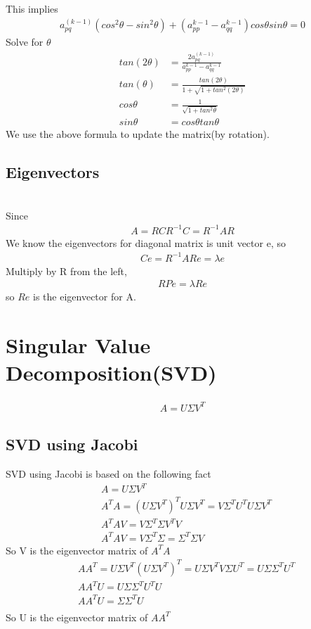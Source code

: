 \documentclass[a4paper]{article}
\begin{document}
This implies
\begin{align*}
	a_{pq}^{(k-1)} (cos^2 \theta - sin^2 \theta) + (a_{pp}^{k-1} - a_{qq}^{k-1}) cos \theta sin \theta = 0
\end{align*}
Solve for $\theta$
\begin{align*}
	tan(2\theta) & = \frac{2 a_{pq}^{(k-1)}}{a_{pp}^{k-1} - a_{qq}^{k-1}} \\
	tan(\theta) & = \frac{tan(2 \theta)}{1 + \sqrt{1 + tan^2 (2 \theta)}} \\
	cos \theta & = \frac{1}{\sqrt{1 + tan^2 \theta}} \\
	sin \theta & = cos \theta tan \theta
\end{align*}
We use the above formula to update the matrix(by rotation). \\
\subsection{Eigenvectors}\\
Since 
\begin{align*}
	A = R C R^{-1}
	C = R^{-1} A R 
\end{align*}
We know the eigenvectors for diagonal matrix is unit vector e, so
\begin{align*}
	Ce = R^{-1} A R e = \lambda e
\end{align*}
Multiply by R from the left, 
\begin{align*}
	RPe = \lambda Re
\end{align*}
so $Re$ is the eigenvector for A.
\section{Singular Value Decomposition(SVD)}
\begin{align*}
	A = U \Sigma V^T
\end{align*}
\subsection{SVD using Jacobi}
SVD using Jacobi is based on the following fact
\begin{align*}
	& A = U \Sigma V^T \\
	& A^T A = (U \Sigma V^T)^T U \Sigma V^T = V \Sigma^T U^T U\Sigma V^T \\
	& A^T A V = V \Sigma^T \Sigma V^T V \\
	& A^T A V = V \Sigma^T \Sigma = \Sigma^T \Sigma V
\end{align*}
So V is the eigenvector matrix of $A^T A$\\
\begin{align*}
	& A A^T =  U \Sigma V^T (U \Sigma V^T)^T = U \Sigma V^T V \Sigma U^T = U \Sigma \Sigma^T U^T \\
	& A A^T U =  U \Sigma \Sigma^T U^T U \\
	& A A^T U =  \Sigma \Sigma^T U \\
\end{align*}
So U is the eigenvector matrix of $A A^T$\\
\end{document}
